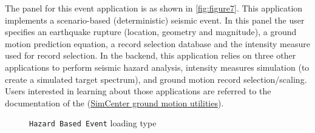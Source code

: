 The panel for this event application is as shown in
\autoref{fig:figure7}.  This application implements a scenario-based
(deterministic) seismic event.  In this panel the user specifies an
earthquake rupture (location, geometry and magnitude), a ground motion
prediction equation, a record selection database and the intensity
measure used for record selection.  In the backend, this application
relies on three other applications to perform seismic hazard analysis,
intensity measures simulation (to create a simulated target spectrum),
and ground motion record selection/scaling.  Users interested in
learning about those applications are referred to the documentation of
the
(\href{https://github.com/NHERI-SimCenter/GroundMotionUtilities/blob/master/Readme.md}{SimCenter
  ground motion utilities}).

\begin{figure}[!htbp]
  \caption{\texttt{Hazard Based Event} loading type}
  \label{fig:figure7}
\end{figure}
